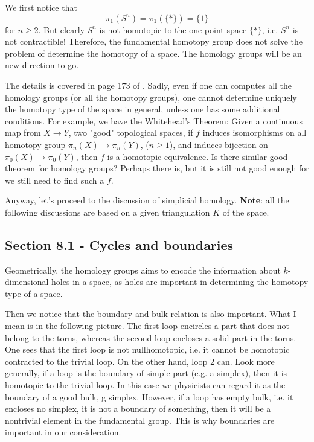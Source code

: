 
We first notice that
\begin{equation}
    \pi_1(S^n)=\pi_1(\{*\}) = \{1\}
\end{equation}
for $n\geq 2$. But clearly $S^n$ is not homotopic to the one point
space $\{*\}$, i.e. $S^n$ is not contractible! Therefore, the
fundamental homotopy group does not solve the problem of determine the
homotopy of a space. The homology groups will be an new direction to go.

The details is covered in page 173 of \cite{book}.
Sadly, even if one can computes all the homology groups (or all the
homotopy groups), one cannot determine uniquely the homotopy type of
the space in general, unless one has some additional conditions.
For example, we have the Whitehead's Theorem: Given a continuous map
from $X\to Y$, two "good" topological spaces, if $f$ induces
isomorphisms on all homotopy group $\pi_n(X)\to\pi_n(Y)$, ($n\geq 1$),
and induces bijection on $\pi_0(X)\to\pi_0(Y)$, then $f$ is a
homotopic equivalence. Is there similar good theorem for homology
groups? Perhaps there is, but it is still not good enough for we still
need to find such a $f$.

Anyway, let's proceed to the discussion of simplicial homology.
\textbf{Note}: all the following discussions are based on a given
triangulation $K$ of the space.

\subsection{Section 8.1 - Cycles and boundaries}
\label{sec:Cycles-and-boundaries}

Geometrically, the homology groups aims to encode the information
about $k$-dimensional holes in a space, as holes are important in
determining the homotopy type of a space. 

Then we notice that the boundary and bulk relation is also important.
What I mean is in the following picture. The first loop encircles
a part that does not belong to the torus, whereas the second loop
encloses a solid part in the torus. One sees that the first loop is
not nullhomotopic, i.e. it cannot be homotopic contracted to the
trivial loop. On the other hand, loop 2 can. Look more generally, if a
loop is the boundary of simple part (e.g. a simplex), then it is
homotopic to the trivial loop. In this case we physicists can regard
it as the boundary of a good bulk, g simplex. However, if a loop has
empty bulk, i.e. it encloses no simplex, it is not a boundary of
something, then it will be a nontrivial element in the fundamental
group. This is why boundaries are important in our consideration.

